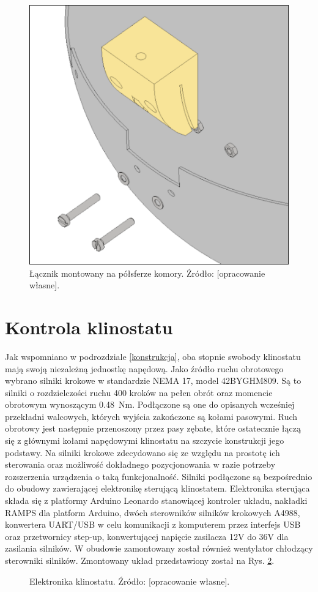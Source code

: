 \begin{figure}
	
	\centering
	\includegraphics[scale=.25]{bottom_half_connector_framed}
	\caption{Łącznik montowany na półsferze komory. Źródło: [opracowanie własne].} 
	\label{fig:łącznik_globus}
	
\end{figure}

\section{Kontrola klinostatu}

Jak wspomniano w podrozdziale \ref{konstrukcja}, oba stopnie swobody klinostatu mają swoją niezależną jednostkę napędową. Jako źródło ruchu obrotowego wybrano silniki krokowe w standardzie NEMA 17, model 42BYGHM809. Są to silniki o rozdzielczości ruchu 400 kroków na pełen obrót oraz momencie obrotowym wynoszącym \SI{0,48}{Nm}. Podłączone są one do opisanych wcześniej przekładni walcowych, których wyjścia zakończone są kołami pasowymi. Ruch obrotowy jest następnie przenoszony przez pasy zębate, które ostatecznie łączą się z głównymi kołami napędowymi klinostatu na szczycie konstrukcji jego podstawy. Na silniki krokowe zdecydowano się ze względu na prostotę ich sterowania oraz możliwość dokładnego pozycjonowania w razie potrzeby rozszerzenia urządzenia o taką funkcjonalność. Silniki podłączone są bezpośrednio do obudowy zawierającej elektronikę sterującą klinostatem. Elektronika sterująca składa się z platformy Arduino Leonardo stanowiącej kontroler układu, nakładki RAMPS dla platform Arduino, dwóch sterowników silników krokowych A4988, konwertera UART/USB w celu komunikacji \linebreak z komputerem przez interfejs USB oraz przetwornicy step-up, konwertującej napięcie zasilacza 12V do 36V dla zasilania silników. W obudowie zamontowany został również wentylator chłodzący sterowniki silników. Zmontowany układ przedstawiony został na Rys. \ref{fig:elektronika}. 

\begin{figure}[ht]
	\centering
	\setlength{\fboxsep}{0pt}
	\setlength{\fboxrule}{1pt}
	\caption{Elektronika klinostatu. Źródło: [opracowanie własne].} 
	\label{fig:elektronika}
\end{figure}